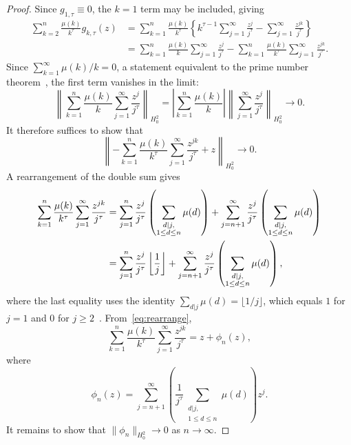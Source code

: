 \documentclass[11pt]{extarticle}
\numberwithin{equation}{section}
\theoremstyle{plain}
\theoremstyle{remark}
\begin{document}
\begin{proof}
Since $g_{1,\tau}\equiv 0$, the $k=1$ term may be included, giving
\begin{align*}
\sum_{k=2}^{n} \frac{\mu(k)}{k^\tau} g_{k,\tau}(z)
&= \sum_{k=1}^{n} \frac{\mu(k)}{k^\tau} \left\{ k^{\tau-1}\sum_{j=1}^{\infty} \frac{z^j}{j^\tau} - \sum_{j=1}^{\infty}\frac{z^{jk}}{j^\tau} \right\}\\
&= \sum_{k=1}^{n} \frac{\mu(k)}{k} \sum_{j=1}^{\infty} \frac{z^j}{j^\tau} - \sum_{k=1}^{n} \frac{\mu(k)}{k^\tau} \sum_{j=1}^{\infty}\frac{z^{jk}}{j^\tau}.
\end{align*}
Since $\sum_{k=1}^{\infty} \mu(k)/k = 0$, a statement equivalent to the prime number
theorem~\cite[Ch.~4]{apostol}, the first term vanishes in the limit:
\[
\left\|\sum_{k=1}^{n} \frac{\mu(k)}{k} \sum_{j=1}^{\infty} \frac{z^j}{j^\tau}\right\|_{H^2_0} 
= \left|\sum_{k=1}^{n} \frac{\mu(k)}{k}\right| \left\|\sum_{j=1}^{\infty} \frac{z^j}{j^\tau}\right\|_{H^2_0} \longrightarrow 0.
\]
It therefore suffices to show that
\begin{equation}\label{eq:suffices}
\left\| -\sum_{k=1}^{n} \frac{\mu(k)}{k^\tau} \sum_{j=1}^{\infty}\frac{z^{jk}}{j^\tau} + z \right\|_{H^2_0} \longrightarrow 0.
\end{equation}
A rearrangement of the double sum gives
\begin{align}
\sum_{k=1}^{n} \frac{\mu(k)}{k^\tau} \sum_{j=1}^{\infty}\frac{z^{jk}}{j^\tau}
&= \sum_{j=1}^{n} \frac{z^j}{j^\tau}\left(\sum_{\substack{d|j,\\ 1\leq d\leq n}}\mu(d)\right) + \sum_{j=n+1}^{\infty} \frac{z^j}{j^\tau}\left(\sum_{\substack{d|j,\\ 1\leq d\leq n}}\mu(d)\right)\notag\\
&= \sum_{j=1}^{n} \frac{z^j}{j^\tau}\left\lfloor\frac{1}{j}\right\rfloor + \sum_{j=n+1}^{\infty} \frac{z^j}{j^\tau}\left(\sum_{\substack{d|j,\\ 1\leq d\leq n}}\mu(d)\right), \label{eq:rearrange}
\end{align}
where the last equality uses the identity $\sum_{d|j}\mu(d) = \lfloor 1/j \rfloor$, which
equals $1$ for $j = 1$ and $0$ for $j \geq 2$~\cite[Theorem~2.1]{apostol}. From~\eqref{eq:rearrange},
\[
\sum_{k=1}^{n} \frac{\mu(k)}{k^\tau} \sum_{j=1}^{\infty}\frac{z^{jk}}{j^\tau} = z + \phi_n(z),
\]
where
\[
\phi_n(z) = \sum_{j=n+1}^{\infty} \left(\frac{1}{j^\tau}\sum_{\substack{d|j,\\ 1\leq d\leq n}}\mu(d)\right) z^j.
\]
It remains to show that $\|\phi_n\|_{H^2_0} \to 0$ as $n \to \infty$. 

\end{proof}
\end{document}
